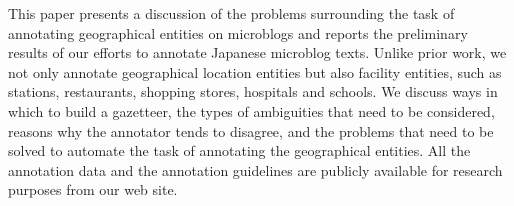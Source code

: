 This paper presents a discussion of the problems surrounding the task of annotating geographical entities on microblogs and reports the preliminary results of our efforts to annotate Japanese microblog texts. Unlike prior work, we not only annotate  geographical location entities but also facility entities, such as stations, restaurants, shopping stores, hospitals and schools. We discuss ways in which to build a gazetteer, the types of ambiguities that need to be considered, reasons why the annotator  tends to disagree, and the problems that need to be solved to automate the task of annotating the geographical entities. All the annotation data and the annotation guidelines are publicly available for research purposes from our web site.
